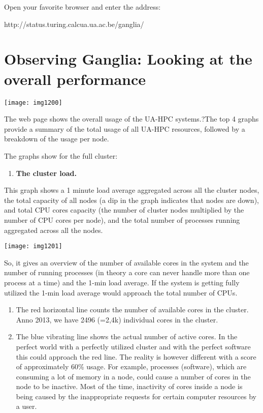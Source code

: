 Open your favorite browser and enter the address:

http://status.turing.calcua.ua.ac.be/ganglia/

\section{Observing Ganglia: Looking at the overall performance}

\texttt{[image: img1200]}

The web page shows the overall usage of the UA-HPC systems.?The top 4 graphs provide a summary of the total usage of all UA-HPC resources, followed by a breakdown of the usage per node.

The graphs show for the full cluster:

\begin{enumerate}
\item  \textbf{The cluster load.}
\end{enumerate}

This graph shows a 1 minute load average aggregated across all the cluster nodes, the total capacity of all nodes (a dip in the graph indicates that nodes are down), and total CPU cores capacity (the number of cluster nodes multiplied by the number of CPU cores per node), and the total number of processes running aggregated across all the nodes.

\texttt{[image: img1201]}

So, it gives an overview of the number of available cores in the system and the number of running processes (in theory a core can never handle more than one process at a time) and the 1-min load average. If the system is getting fully utilized the 1-min load average would approach the total number of CPUs.

\begin{enumerate}
\item \textbf{ }The red horizontal line counts the number of available cores in the cluster. Anno 2013, we have 2496 (=2,4k) individual cores in the cluster.
\item  The blue vibrating line shows the actual number of active cores. In the perfect world with a perfectly utilized cluster and with the perfect software this could approach the red line. The reality is however different with a score of approximately 60\% usage. For example, processes (software), which are consuming a lot of memory in a node, could cause a number of cores in the node to be inactive.  Most of the time, inactivity of cores inside a node is being caused by the inappropriate requests for certain computer resources by a user.
\end{enumerate}

